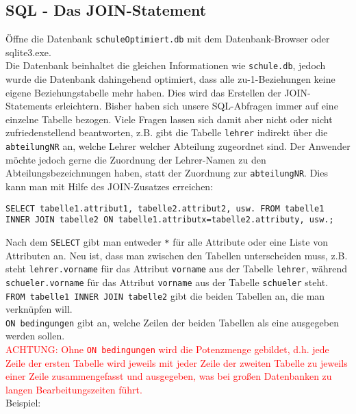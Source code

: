 \subsection[JOIN-Statement]{SQL - Das JOIN-Statement}
Öffne die Datenbank \texttt{schuleOptimiert.db} mit dem Datenbank-Browser oder sqlite3.exe.\\
Die Datenbank beinhaltet die gleichen Informationen wie \texttt{schule.db}, jedoch wurde die Datenbank dahingehend optimiert, dass alle zu-1-Beziehungen keine eigene Beziehungstabelle mehr haben. Dies wird das Erstellen der JOIN-Statements erleichtern.
Bisher haben sich unsere SQL-Abfragen immer auf eine einzelne Tabelle bezogen. Viele Fragen lassen sich damit aber nicht oder nicht zufriedenstellend beantworten, z.B. gibt die Tabelle \lstinline!lehrer! indirekt über die \lstinline!abteilungNR! an, welche Lehrer welcher Abteilung zugeordnet sind. Der Anwender möchte jedoch gerne die Zuordnung der Lehrer-Namen zu den Abteilungsbezeichnungen haben, statt der Zuordnung zur \lstinline!abteilungNR!. Dies kann man mit Hilfe des JOIN-Zusatzes erreichen:
\begin{tcolorbox}[title=JOIN-Statement]
	\lstinline!SELECT tabelle1.attribut1, tabelle2.attribut2, usw. FROM tabelle1!\\
	\lstinline!INNER JOIN tabelle2 ON tabelle1.attributx=tabelle2.attributy, usw.;!
\end{tcolorbox}
Nach dem \lstinline!SELECT! gibt man entweder \lstinline!*! für alle Attribute oder  eine Liste von Attributen an. Neu ist, dass man zwischen den Tabellen unterscheiden muss, z.B. steht \lstinline!lehrer.vorname! für das Attribut \lstinline!vorname! aus der Tabelle \lstinline!lehrer!, während \lstinline!schueler.vorname! für das Attribut \lstinline!vorname! aus der Tabelle \lstinline!schueler! steht.\\
\lstinline!FROM tabelle1 INNER JOIN tabelle2! gibt die beiden Tabellen an, die man verknüpfen will.\\
\lstinline!ON bedingungen! gibt an, welche Zeilen der beiden Tabellen als eine ausgegeben werden sollen.\\
\textcolor{red}{ACHTUNG: Ohne \lstinline!ON bedingungen! wird die Potenzmenge gebildet, d.h. jede Zeile der ersten Tabelle wird jeweils mit jeder Zeile der zweiten Tabelle zu jeweils einer Zeile zusammengefasst und ausgegeben, was bei großen Datenbanken zu langen Bearbeitungszeiten führt.}\\
Beispiel:\\
